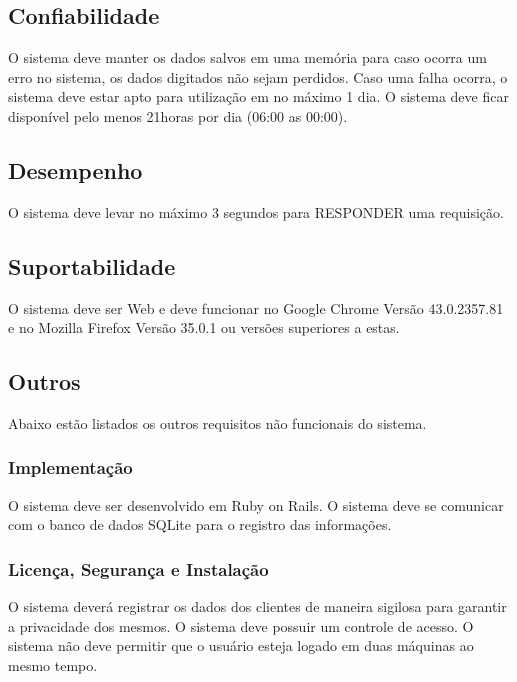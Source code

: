 \subsection{Confiabilidade}

O sistema deve manter os dados salvos em uma memória para caso ocorra um erro no sistema, os dados digitados não sejam perdidos.
Caso uma falha ocorra, o sistema deve estar apto para utilização em no máximo 1 dia.
O sistema deve ficar disponível pelo menos 21horas por dia (06:00 as 00:00).

\subsection{Desempenho}

O sistema deve levar no máximo 3 segundos para RESPONDER uma requisição.

\subsection{Suportabilidade}

O sistema deve ser Web e deve funcionar no Google Chrome Versão
43.0.2357.81 e no Mozilla Firefox Versão 35.0.1 ou versões superiores a estas.

\subsection{Outros}

Abaixo estão listados os outros requisitos não funcionais do sistema.

\subsubsection{Implementação}

O sistema deve ser desenvolvido em Ruby on Rails.
O sistema deve se comunicar com o banco de dados SQLite para o registro das informações.

\subsubsection{Licença, Segurança e Instalação}

O sistema deverá registrar os dados dos clientes de maneira sigilosa para garantir a privacidade dos mesmos.
O sistema deve possuir um controle de acesso.
O sistema não deve permitir que o usuário esteja logado em duas máquinas ao mesmo tempo.